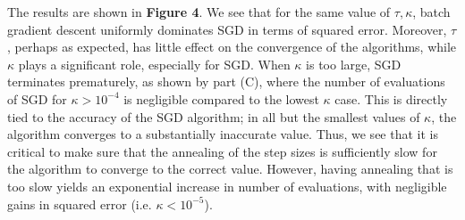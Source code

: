 \documentclass[psamsfonts]{amsart}
\theoremstyle{definition}
\theoremstyle{remark}
\numberwithin{equation}{section}
\begin{document}
The results are shown in {\bf Figure 4}. We see that for the same value of $\tau, \kappa$, batch gradient descent uniformly dominates SGD in terms of squared error. Moreover, $\tau$, perhaps as expected, has little effect on the convergence of the algorithms, while $\kappa$ plays a significant role, especially for SGD. When $\kappa$ is too large, SGD terminates prematurely, as shown by part (C), where the number of evaluations of SGD for $\kappa > 10^{-4}$ is negligible compared to the lowest $\kappa$ case. This is directly tied to the accuracy of the SGD algorithm; in all but the smallest values of $\kappa$, the algorithm converges to a substantially inaccurate value. Thus, we see that it is critical to make sure that the annealing of the step sizes is sufficiently slow for the algorithm to converge to the correct value. However, having annealing that is too slow yields an exponential increase in number of evaluations, with negligible gains in squared error (i.e. $\kappa < 10^{-5}$).
\end{document}
